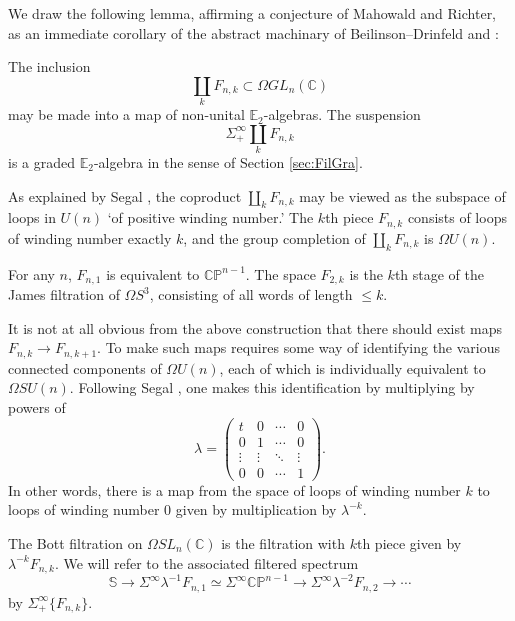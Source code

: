 We draw the following lemma, affirming a conjecture of Mahowald and Richter, as an immediate corollary of the abstract machinary of Beilinson--Drinfeld \cite[3.1.14]{Zhu} and \cite[5.5.4.10]{HA}:

\begin{lem}  
The inclusion 
$$\coprod_k F_{n,k} \subset \Omega GL_n(\mathbb{C})$$
may be made into a map of non-unital $\mathbb{E}_2$-algebras.  The suspension $$\Sigma^{\infty}_+ \coprod_k F_{n,k}$$ is a graded $\mathbb{E}_2$-algebra in the sense of Section \ref{sec:FilGra}.
\end{lem}

As explained by Segal \cite{Segal}, the coproduct $\coprod_k F_{n,k}$ may be viewed as the subspace of loops in $U(n)$ `of positive winding number.'  The $k$th piece $F_{n,k}$ consists of loops of winding number exactly $k$, and the group completion of $\coprod_k F_{n,k}$ is $\Omega U(n)$.

\begin{exm}
For any $n$, $F_{n,1}$ is equivalent to $\mathbb{CP}^{n-1}$.  The space $F_{2,k}$ is the $k$th stage of the James filtration of $\Omega S^3$, consisting of all words of length $\le k$.
\end{exm}

It is not at all obvious from the above construction that there should exist maps $F_{n,k} \rightarrow F_{n,k+1}$.  To make such maps requires some way of identifying the various connected components of $\Omega U(n)$, each of which is individually equivalent to $\Omega SU(n)$.  Following Segal \cite[pg. 3--4]{Segal}, one makes this identification by multiplying by powers of 
$$\lambda = \left( \begin{array}{cccc} t & 0 & \cdots & 0 \\ 0 & 1 & \cdots & 0 \\ \vdots & \vdots & \ddots & \vdots \\ 0 & 0 & \cdots & 1 \end{array} \right).$$
In other words, there is a map from the space of loops of winding number $k$ to loops of winding number $0$ given by multiplication by $\lambda^{-k}$.

\begin{dfn}
The Bott filtration on $\Omega SL_n(\mathbb{C})$ is the filtration with $k$th piece given by $\lambda^{-k} F_{n,k}$.  We will refer to the associated filtered spectrum 
$$\mathbb{S} \rightarrow \Sigma^{\infty} \lambda^{-1} F_{n,1} \simeq \Sigma^{\infty} \mathbb{CP}^{n-1} \rightarrow \Sigma^{\infty} \lambda^{-2} F_{n,2} \rightarrow \cdots$$
by $\Sigma^{\infty}_+ \{F_{n,k}\}$.
\end{dfn}

